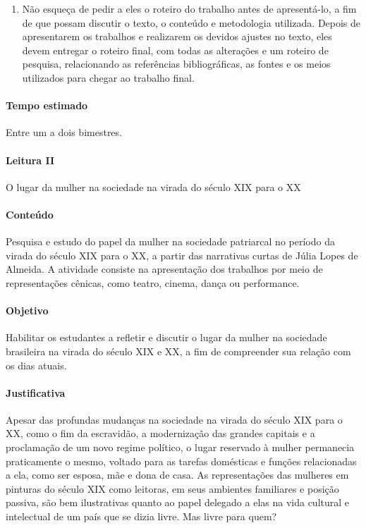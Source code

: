 \documentclass[12pt]{extarticle}
\begin{document}
\begin{enumerate}
\item
Não esqueça de pedir a eles o roteiro do trabalho antes de
apresentá-lo, a fim de que possam discutir o texto, o conteúdo e
metodologia utilizada. Depois de apresentarem os trabalhos e realizarem
os devidos ajustes no texto, eles devem entregar o roteiro final, com
todas as alterações e um roteiro de pesquisa, relacionando as
referências bibliográficas, as fontes e os meios utilizados para chegar
ao trabalho final.
\end{enumerate}

\paragraph{Tempo estimado} Entre um a dois bimestres.



\paragraph{Leitura II} O lugar da mulher na sociedade na virada do século \textsc{XIX} para o \textsc{XX}







\paragraph{Conteúdo} Pesquisa e estudo do papel da mulher na sociedade
patriarcal no período da virada do século \textsc{XIX} para o \textsc{XX}, a partir das
narrativas curtas de Júlia Lopes de Almeida. A atividade consiste na
apresentação dos trabalhos por meio de representações cênicas, como
teatro, cinema, dança ou performance.

\paragraph{Objetivo} Habilitar os estudantes a refletir e discutir o lugar
da mulher na sociedade brasileira na virada do século XIX e XX, a fim de
compreender sua relação com os dias atuais.

\paragraph{Justificativa} Apesar das profundas mudanças na sociedade na
virada do século XIX para o XX, como o fim da escravidão, a modernização
das grandes capitais e a proclamação de um novo regime político, o lugar
reservado à mulher permanecia praticamente o mesmo, voltado para as
tarefas domésticas e funções relacionadas a ela, como ser esposa, mãe e
dona de casa. As representações das mulheres em pinturas do século XIX
como leitoras, em seus ambientes familiares e posição passiva, são bem
ilustrativas quanto ao papel delegado a elas na vida cultural e
intelectual de um país que se dizia livre. Mas livre para quem?
\end{document}
